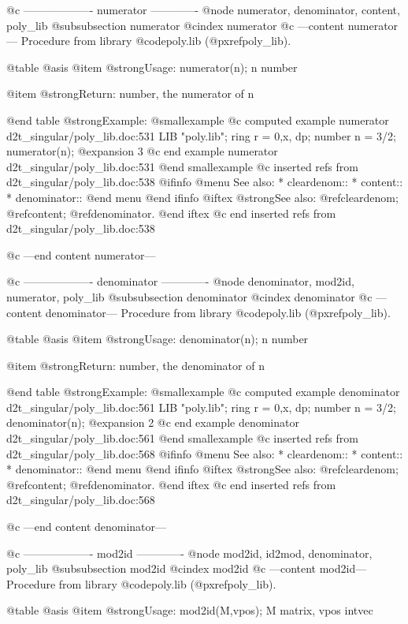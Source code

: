 @c ------------------- numerator -------------
@node numerator, denominator, content, poly_lib
@subsubsection numerator
@cindex numerator
@c ---content numerator---
Procedure from library @code{poly.lib} (@pxref{poly_lib}).

@table @asis
@item @strong{Usage:}
numerator(n); n number

@item @strong{Return:}
number, the numerator of n

@end table
@strong{Example:}
@smallexample
@c computed example numerator d2t_singular/poly_lib.doc:531 
LIB "poly.lib";
ring r = 0,x, dp;
number n = 3/2;
numerator(n);
@expansion{} 3
@c end example numerator d2t_singular/poly_lib.doc:531
@end smallexample
@c inserted refs from d2t_singular/poly_lib.doc:538
@ifinfo
@menu
See also:
* cleardenom::
* content::
* denominator::
@end menu
@end ifinfo
@iftex
@strong{See also:}
@ref{cleardenom};
@ref{content};
@ref{denominator}.
@end iftex
@c end inserted refs from d2t_singular/poly_lib.doc:538

@c ---end content numerator---

@c ------------------- denominator -------------
@node denominator, mod2id, numerator, poly_lib
@subsubsection denominator
@cindex denominator
@c ---content denominator---
Procedure from library @code{poly.lib} (@pxref{poly_lib}).

@table @asis
@item @strong{Usage:}
denominator(n); n number

@item @strong{Return:}
number, the denominator of n

@end table
@strong{Example:}
@smallexample
@c computed example denominator d2t_singular/poly_lib.doc:561 
LIB "poly.lib";
ring r = 0,x, dp;
number n = 3/2;
denominator(n);
@expansion{} 2
@c end example denominator d2t_singular/poly_lib.doc:561
@end smallexample
@c inserted refs from d2t_singular/poly_lib.doc:568
@ifinfo
@menu
See also:
* cleardenom::
* content::
* denominator::
@end menu
@end ifinfo
@iftex
@strong{See also:}
@ref{cleardenom};
@ref{content};
@ref{denominator}.
@end iftex
@c end inserted refs from d2t_singular/poly_lib.doc:568

@c ---end content denominator---

@c ------------------- mod2id -------------
@node mod2id, id2mod, denominator, poly_lib
@subsubsection mod2id
@cindex mod2id
@c ---content mod2id---
Procedure from library @code{poly.lib} (@pxref{poly_lib}).

@table @asis
@item @strong{Usage:}
mod2id(M,vpos); M matrix, vpos intvec

